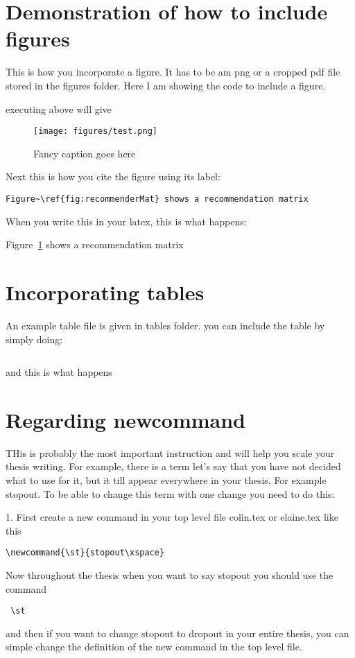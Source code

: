 \section{Demonstration of how to include figures}

This is how you incorporate a figure. It has to be am png or a cropped pdf file stored in the figures folder. Here I am showing the code to include a figure. 

executing above will give 

\begin{figure}[ht!]
  \caption{Fancy caption goes here}\label{fig:recommenderMat}
  \centering
    \texttt{[image: figures/test.png]}
\end{figure}


Next this is how you cite the figure using its label:

\begin{verbatim}
Figure~\ref{fig:recommenderMat} shows a recommendation matrix 
\end{verbatim}

When you write this in your latex, this is what happens:

Figure~\ref{fig:recommenderMat} shows a recommendation matrix 



\section{Incorporating tables}

An example table file is given in tables folder. you can include the table by simply doing: 

\begin{verbatim}

\end{verbatim}


and this is what happens 


\section{Regarding newcommand} 
THis is probably the most important instruction and will help you scale your thesis writing. For example, there is a term let's say that you have not decided what to use for it, but it till appear everywhere in your thesis. For example stopout. To be able to change this term with one change you need to do this: 

1. First create a new command in your top level file colin.tex or elaine.tex like this 

\begin{verbatim}
\newcommand{\st}{stopout\xspace}
\end{verbatim}

Now throughout the thesis when you want to say stopout you should use the command
\begin{verbatim}
 \st
 \end{verbatim}
 
 and then if you want to change stopout to dropout in your entire thesis, you can simple change the definition of the new command in the top level file. 